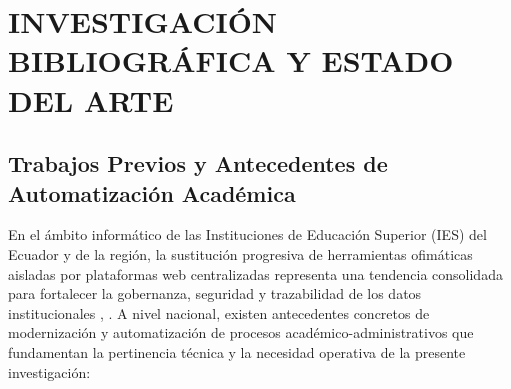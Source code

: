 
\section{INVESTIGACIÓN BIBLIOGRÁFICA Y ESTADO DEL ARTE}

\subsection{Trabajos Previos y Antecedentes de Automatización Académica}

En el ámbito informático de las Instituciones de Educación Superior (IES) del Ecuador y de la región, la sustitución progresiva de herramientas ofimáticas aisladas por plataformas web centralizadas representa una tendencia consolidada para fortalecer la gobernanza, seguridad y trazabilidad de los datos institucionales \cite{kendall_systems}, \cite{pressman_eng}. A nivel nacional, existen antecedentes concretos de modernización y automatización de procesos académico-administrativos que fundamentan la pertinencia técnica y la necesidad operativa de la presente investigación:

